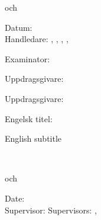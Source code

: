 {\begin{flushleft}
  \sffamily
  \ifinswedish
    \@prgmcode\par
    \ifx\@prgmcode och \@secondprgmcode \par  \fi   %
    \ifx\@date\@empty\relax\else Datum: \@date\\ \vspace{5mm} \fi
    Handledare: \@supervisorAsFirstname\space\@supervisorAsLastname
    \ifx\@supervisorBsLastname\@empty
    \else
    , \@supervisorBsFirstname\space\@supervisorBsLastname
    \fi %
    \ifx\@supervisorCsLastname\@empty
    \else
    , \@supervisorCsFirstname\space\@supervisorCsLastname
    \fi %
    \ifx\@supervisorDsLastname\@empty
    \else
    , \@supervisorDsFirstname\space\@supervisorDsLastname
    \fi
    \ifx\@supervisorEsLastname\@empty
    \else
    , \@supervisorEsFirstname\space\@supervisorEsLastname
    \fi
    \par
    Examinator: \@examinersFirstname\space\@examinersLastname\par
    \quad\@examinersSchool\par
    \ifx\@hostcompany\@empty\relax\else Uppdragsgivare: \@hostcompany \par \fi
    \ifx\@hostorganization\@empty\relax\else Uppdragsgivare: \@hostorganization \par \fi
    \ifx\@alttitle\empty\relax\else Engelsk titel: %
    \begin{otherlanguage}{english}\sffamily\@alttitle\end{otherlanguage} \fi
    \ifx\@altsubtitle\@empty\relax
    \else
    English subtitle \begin{otherlanguage}{english}\sffamily\@altsubtitle\end{otherlanguage} \\
    \fi
  \else
    \@prgmcode\par
    \ifx\@prgmcode och \@secondprgmcode \par  \fi   %
    \ifx\@date\@empty\relax\else Date: \@date\\ \vspace{5mm} \fi
    \ifx\@supervisorBsLastname\@empty
    Supervisor: \@supervisorAsFirstname\space\@supervisorAsLastname
    \else
    Supervisors: \@supervisorAsFirstname\space\@supervisorAsLastname,  \@supervisorBsFirstname\space\@supervisorBsLastname

\end{flushleft}}
